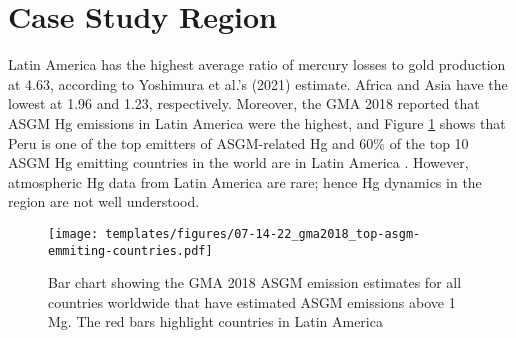 \section{Case Study Region}
\begin{flushleft}
Latin America has the highest average ratio of mercury losses to gold production at 4.63, according to Yoshimura et al.'s (2021) estimate. Africa and Asia have the lowest at 1.96 and 1.23, respectively. Moreover, the GMA 2018 reported that ASGM Hg emissions in Latin America were the highest, and Figure \ref{fig:global_asgm_emissions_above_a_tone_barchart} shows that Peru is one of the top emitters of ASGM-related Hg and 60\% of the top 10 ASGM Hg emitting countries in the world are in Latin America  \cite{united_nations_environment_programme_technical_2019}. However, atmospheric Hg data from Latin America are rare; hence Hg dynamics in the region are not well understood. 
\end{flushleft}
\begin{figure}[H]
  \texttt{[image: templates/figures/07-14-22\_gma2018\_top-asgm-emmiting-countries.pdf]}
  \centering
  \caption{Bar chart showing the GMA 2018 ASGM \hg emission estimates for all countries worldwide that have estimated ASGM \hg emissions above 1 Mg. The red bars highlight countries in Latin America \cite{united_nations_environment_programme_technical_2019}}
  \label{fig:global_asgm_emissions_above_a_tone_barchart}
\end{figure}
\FloatBarrier
